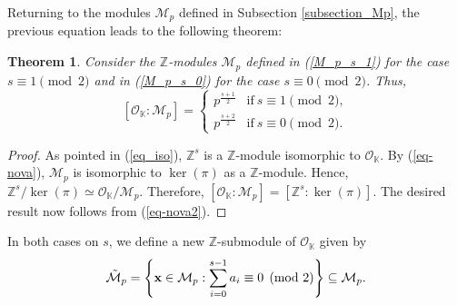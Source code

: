 \documentclass{amsart}
\newtheorem{theorem}{Theorem}
\newtheorem{proposition}[theorem]{Proposition}
\begin{document}
Returning to the modules $\mathcal{M}_p$ defined in Subsection \ref{subsection_Mp}, the previous equation leads to the following theorem:

\begin{theorem} \label{prop-3} Consider the $\mathbb{Z}$-modules $\mathcal{M}_p$ defined in (\ref{M_p_s_1}) for the case $s\equiv 1\pmod 2$ and in (\ref{M_p_s_0}) for the case $s\equiv 0\pmod 2$. Thus, $$[\mathcal{O}_{\mathbb{K}}:\mathcal{M}_p]=\left\{\begin{matrix}
   p^{\frac{s+1}{2}}  &  \mbox{if}~s\equiv 1\pmod 2,\\
   p^{\frac{s+2}{2}}  &  \mbox{if}~s\equiv 0\pmod 2. \end{matrix}\right.$$ 
\end{theorem}
\begin{proof}
As pointed in (\ref{eq_iso}), $\mathbb{Z}^s$ is a $\mathbb{Z}$-module isomorphic to $\mathcal{O}_\mathbb{K}$. By (\ref{eq-nova}), $\mathcal{M}_p$ is isomorphic to $\ker(\pi)$ as a $\mathbb{Z}$-module. Hence, $\mathbb{Z}^s/\ker(\pi)\simeq \mathcal{O}_\mathbb{K}/\mathcal{M}_p$. Therefore, $[\mathcal{O}_{\mathbb{K}}:\mathcal{M}_p]=[\mathbb{Z}^s:\ker(\pi)]$. The desired result now follows from (\ref{eq-nova2}).
\end{proof}

In both cases on $s$, we define a new $\mathbb{Z}$-submodule of $\mathcal{O}_\mathbb{K}$ given by
\begin{equation}\label{moduloMnew}
\tilde{\mathcal{M}}_p=\left\{{\bf x}\in\mathcal{M}_p:\displaystyle \sum_{i=0}^{s-1}a_i\equiv 0\pmod 2\right\}\subseteq\mathcal{M}_p.
\end{equation}


\end{document}
